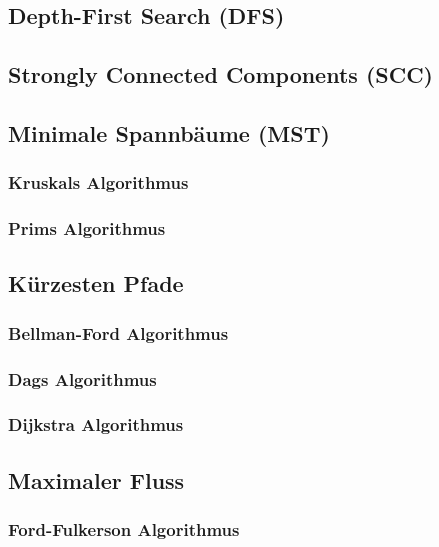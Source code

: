 \documentclass[
../../AuD-Zusammenfassung.tex,
]
{subfiles}
\begin{document}
\subsection{Depth-First Search (DFS)}


\subsection{Strongly Connected Components (SCC)}

\newpage
\subsection{Minimale Spannbäume (MST)}
\subsubsection{Kruskals Algorithmus}
\subsubsection{Prims Algorithmus}

\newpage
\subsection{Kürzesten Pfade}
\subsubsection{Bellman-Ford Algorithmus}
\subsubsection{Dags Algorithmus}
\subsubsection{Dijkstra Algorithmus}

\newpage
\subsection{Maximaler Fluss}
\subsubsection{Ford-Fulkerson Algorithmus}
\end{document}
